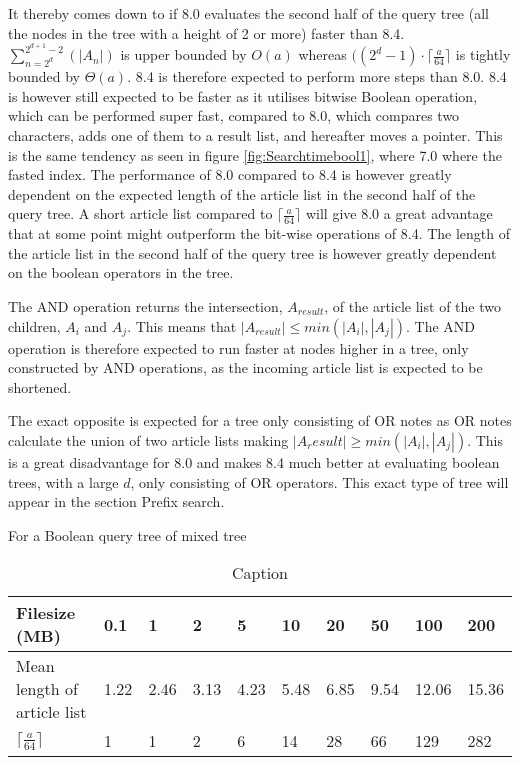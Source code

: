 It thereby comes down to if 8.0 evaluates the second half of the query tree (all the nodes in the tree with a height of 2 or more) faster than 8.4.  $\sum_{n=2^d}^{2^{d+1}-2}(|A_n|)$ is upper bounded by $O(a)$ whereas $((2^{d}-1) \cdot \lceil \frac{a}{64} \rceil$ is tightly bounded by $\Theta(a)$. 8.4 is therefore expected to perform more steps than 8.0. 8.4 is however still expected to be faster as it utilises bitwise Boolean operation, which can be performed super fast, compared to 8.0, which compares two characters, adds one of them to a result list, and hereafter moves a pointer. This is the same tendency as seen in figure \ref{fig:Searchtimebool1}, where 7.0 where the fasted index. The performance of 8.0 compared to 8.4 is however greatly dependent on the expected length of the article list in the second half of the query tree. A short article list compared to $\lceil \frac{a}{64} \rceil$ will give 8.0 a great advantage that at some point might outperform the bit-wise operations of 8.4. The length of the article list in the second half of the query tree is however greatly dependent on the boolean operators in the tree. 

The AND operation returns the intersection, $A_{result}$, of the article list of the two children, $A_i$ and $A_j$. This means that $|A_{result}|\leq min(|A_i|,|A_j|)$. The AND operation is therefore expected to run faster at nodes higher in a tree, only constructed by AND operations, as the incoming article list is expected to be shortened. 

The exact opposite is expected for a tree only consisting of OR notes as OR notes calculate the union of two article lists making $|A_result|\geq min(|A_i|,|A_j|)$. This is a great disadvantage for 8.0 and makes 8.4 much better at evaluating boolean trees, with a large $d$, only consisting of OR operators. This exact type of tree will appear in the section Prefix search.

For a Boolean query tree of mixed tree 


\begin{table}[H]
\begin{tabular}{l|lllllllll}
 Filesize (MB)                           & 0.1 & 1     & 2      & 5      & 10 & 20     & 50     & 100 & 200 \\
 \hline 
Mean length of article list &  1.22   & 2.46     & 3.13      & 4.23      & 5.48      &  6.85     &  9.54    &  12.06      &  15.36      \\
  $\lceil \frac{a}{64} \rceil$                          &  1      & 1        & 2         &  6        & 14      &  28       &  66     & 129     &  282    
\end{tabular}
\caption{Caption}
\label{fig: Searchtimebool7}
\end{table}

